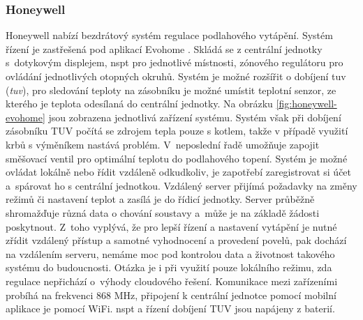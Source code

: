 \subsubsection{Honeywell}
Honeywell nabízí bezdrátový systém regulace podlahového vytápění. Systém řízení je zastřešená pod aplikací Evohome \cite{honeywell-evohome-stranky}. Skládá se z centrální jednotky s~dotykovým displejem, \acrshort{nspt} pro jednotlivé místnosti, zónového regulátoru pro ovládání jednotlivých otopných okruhů. Systém je možné rozšířit o dobíjení \acrshort{tuv} (\textit{\acrlong{tuv}}), pro sledování teploty na zásobníku je možné umístit teplotní senzor, ze kterého je teplota odesílaná do centrální jednotky. Na obrázku \ref{fig:honeywell-evohome} jsou zobrazena jednotlivá zařízení systému. Systém však při dobíjení zásobníku TUV počítá se zdrojem tepla pouze s kotlem, takže v případě využití krbů s výměníkem nastává problém. V~neposlední řadě umožňuje zapojit směšovací ventil pro optimální teplotu do podlahového topení. Systém je možné ovládat lokálně nebo řídit vzdáleně odkudkoliv, je zapotřebí zaregistrovat si účet a~spárovat ho s  centrální jednotkou. Vzdálený server přijímá požadavky na změny režimů či nastavení teplot a zasílá je do řídicí jednotky. Server průběžně shromažďuje různá data o chování soustavy a~může je na základě žádosti poskytnout. Z~toho vyplývá, že pro lepší řízení a nastavení vytápění je nutné zřídit vzdálený přístup a samotné vyhodnocení a provedení povelů, pak dochází na vzdálením serveru, nemáme moc pod kontrolou data a životnost takového systému do budoucnosti. Otázka je i při využití pouze lokálního režimu, zda regulace nepřichází o~výhody cloudového řešení. Komunikace mezi zařízeními probíhá na frekvenci 868 MHz, připojení k centrální jednotce pomocí mobilní aplikace je pomocí WiFi. \acrshort{nspt} a řízení dobíjení TUV jsou napájeny z baterií.




